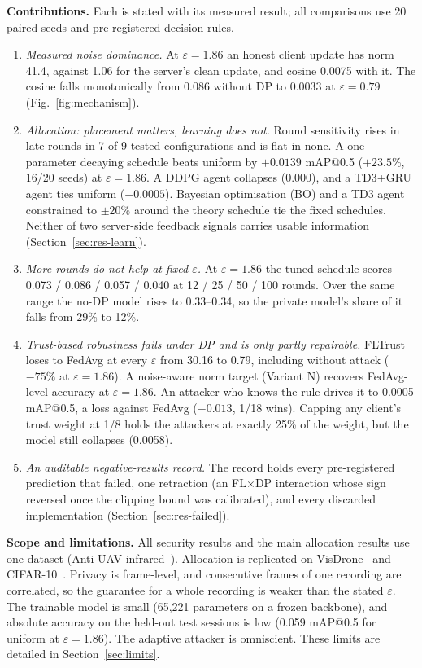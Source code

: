 \documentclass[journal]{IEEEtran}
\makeatletter
\newcommand{\eps}{\varepsilon}
\newcommand{\mAP}{mAP@0.5}
\makeatother
\begin{document}
\textbf{Contributions.} Each is stated with its measured result; all comparisons use 20 paired
seeds and pre-registered decision rules.
\begin{enumerate}
  \item \emph{Measured noise dominance.} At $\eps = 1.86$ an honest client update has norm 41.4,
  against 1.06 for the server's clean update, and cosine 0.0075 with it. The cosine falls
  monotonically from 0.086 without DP to 0.0033 at $\eps = 0.79$ (Fig.~\ref{fig:mechanism}).
  \item \emph{Allocation: placement matters, learning does not.} Round sensitivity rises in late
  rounds in 7 of 9 tested configurations and is flat in none. A one-parameter decaying schedule beats
  uniform by $+0.0139$ \mAP{} ($+23.5\%$, 16/20 seeds) at $\eps = 1.86$. A DDPG agent collapses
  (0.000), and a TD3+GRU agent ties uniform ($-0.0005$). Bayesian optimisation (BO) and a TD3 agent
  constrained to $\pm20\%$ around the theory schedule tie the fixed schedules. Neither of two
  server-side feedback signals carries usable information (Section~\ref{sec:res-learn}).
  \item \emph{More rounds do not help at fixed $\eps$.} At $\eps = 1.86$ the tuned schedule scores
  0.073 / 0.086 / 0.057 / 0.040 at 12 / 25 / 50 / 100 rounds. Over the same range the no-DP model
  rises to 0.33--0.34, so the private model's share of it falls from 29\% to 12\%.
  \item \emph{Trust-based robustness fails under DP and is only partly repairable.} FLTrust loses to
  FedAvg at every $\eps$ from 30.16 to 0.79, including without attack ($-75\%$ at $\eps = 1.86$). A
  noise-aware norm target (Variant N) recovers FedAvg-level accuracy at $\eps = 1.86$. An attacker who
  knows the rule drives it to 0.0005 \mAP{}, a loss against FedAvg ($-0.013$, 1/18 wins). Capping any
  client's trust weight at 1/8 holds the attackers at exactly 25\% of the weight, but the model still
  collapses (0.0058).
  \item \emph{An auditable negative-results record.} The record holds every pre-registered prediction
  that failed, one retraction (an FL$\times$DP interaction whose sign reversed once the clipping
  bound was calibrated), and every discarded implementation (Section~\ref{sec:res-failed}).
\end{enumerate}

\textbf{Scope and limitations.} All security results and the main allocation results use one
dataset (Anti-UAV infrared~\cite{zhao2023antiuav}). Allocation is replicated on VisDrone~\cite{zhu2022visdrone} and
CIFAR-10~\cite{krizhevsky2009cifar}. Privacy is frame-level, and consecutive frames of one recording are correlated, so the
guarantee for a whole recording is weaker than the stated $\eps$. The trainable model is small
(65,221 parameters on a frozen backbone), and absolute accuracy on the held-out test sessions is low
(0.059 \mAP{} for uniform at $\eps = 1.86$). The adaptive attacker is omniscient. These limits are
detailed in Section~\ref{sec:limits}.
\end{document}
